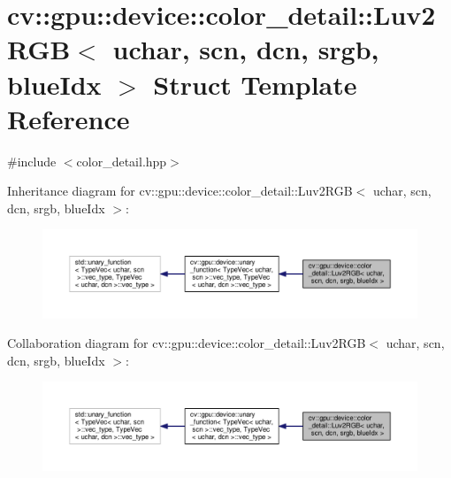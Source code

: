 \hypertarget{structcv_1_1gpu_1_1device_1_1color__detail_1_1Luv2RGB_3_01uchar_00_01scn_00_01dcn_00_01srgb_00_01blueIdx_01_4}{\section{cv\-:\-:gpu\-:\-:device\-:\-:color\-\_\-detail\-:\-:Luv2\-R\-G\-B$<$ uchar, scn, dcn, srgb, blue\-Idx $>$ Struct Template Reference}
\label{structcv_1_1gpu_1_1device_1_1color__detail_1_1Luv2RGB_3_01uchar_00_01scn_00_01dcn_00_01srgb_00_01blueIdx_01_4}
}


{\ttfamily \#include $<$color\-\_\-detail.\-hpp$>$}



Inheritance diagram for cv\-:\-:gpu\-:\-:device\-:\-:color\-\_\-detail\-:\-:Luv2\-R\-G\-B$<$ uchar, scn, dcn, srgb, blue\-Idx $>$\-:\nopagebreak
\begin{figure}[H]
\begin{center}
\leavevmode
\includegraphics[width=350pt]{structcv_1_1gpu_1_1device_1_1color__detail_1_1Luv2RGB_3_01uchar_00_01scn_00_01dcn_00_01srgb_00_01blueIdx_01_4__inherit__graph}
\end{center}
\end{figure}


Collaboration diagram for cv\-:\-:gpu\-:\-:device\-:\-:color\-\_\-detail\-:\-:Luv2\-R\-G\-B$<$ uchar, scn, dcn, srgb, blue\-Idx $>$\-:\nopagebreak
\begin{figure}[H]
\begin{center}
\leavevmode
\includegraphics[width=350pt]{structcv_1_1gpu_1_1device_1_1color__detail_1_1Luv2RGB_3_01uchar_00_01scn_00_01dcn_00_01srgb_00_01blueIdx_01_4__coll__graph}
\end{center}
\end{figure}
